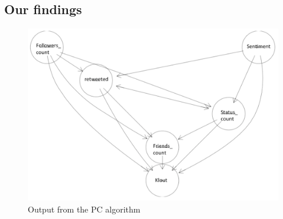 \subsection{Our findings}

\begin{center}
\begin{figure}
\includegraphics[scale=0.2]{pc}
\caption{Output from the PC algorithm}
\end{figure}
\end{center}

